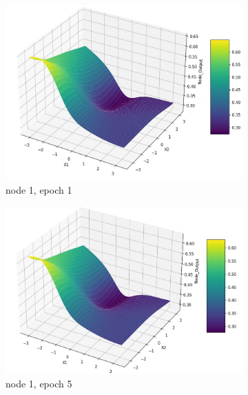 \documentclass[11pt]{article}
\begin{document}
\begin{figure}[h!]
\centering
	\begin{subfigure}[b]{0.30\textwidth}
	\centering
	\includegraphics[scale=0.14]{output_n1_e1.jpg}
	\caption{node 1, epoch 1}
	\label{fig:fig2.1.3.1}
	\end{subfigure}
	\begin{subfigure}[b]{0.30\textwidth}
	\centering
	\includegraphics[scale=0.14]{output_n1_e5.jpg}
	\caption{node 1, epoch 5}
	\label{fig:fig2.1.3.2}
	\end{subfigure}
	\begin{subfigure}[b]{0.30\textwidth}
	\centering

\end{subfigure}
\end{figure}
\end{document}
